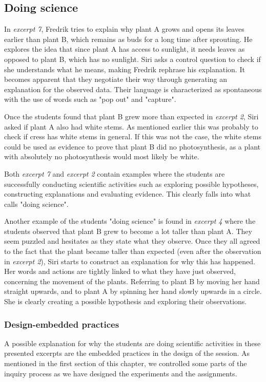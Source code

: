 \subsection{Doing science}
In \emph{excerpt 7}, Fredrik tries to explain why plant A grows and opens its leaves earlier than plant B, which remains as buds for a long time after sprouting. He explores the idea that since plant A has access to sunlight, it needs leaves as opposed to plant B, which has no sunlight. Siri asks a control question to check if she understands what he means, making Fredrik rephrase his explanation. It becomes apparent that they negotiate their way through generating an explanation for the observed data. Their language is characterized as spontaneous \citep{vygotsky2012thought} with the use of words such as "pop out" and "capture". 

Once the students found that plant B grew more than expected in \emph{excerpt 2}, Siri asked if plant A also had white stems. As mentioned earlier this was probably to check if cress has white stems in general. If this was not the case, the white stems could be used as evidence to prove that plant B did no photosynthesis, as a plant with absolutely no photosynthesis would most likely be white. 

Both \emph{excerpt 7} and \emph{excerpt 2} contain examples where the students are successfully conducting scientific activities such as exploring possible hypotheses, constructing explanations and evaluating evidence. This clearly falls into what \citet{jimenez2000doing} calls "doing science".

Another example of the students "doing science" is found in \emph{excerpt 4} where the students observed that plant B grew to become a lot taller than plant A. They seem puzzled and hesitates as they state what they observe. Once they all agreed to the fact that the plant became taller than expected (even after the observation in \emph{excerpt 2}), Siri starts to construct an explanation for why this has happened. Her words and actions are tightly linked to what they have just observed, concerning the movement of the plants. Referring to plant B by moving her hand straight upwards, and to plant A by spinning her hand slowly upwards in a circle. She is clearly creating a possible hypothesis and exploring their observations. 

\subsubsection{Design-embedded practices}
A possible explanation for why the students are doing scientific activities in these presented excerpts are the embedded practices in the design of the session. As mentioned in the first section of this chapter, we controlled some parts of the inquiry process as we have designed the experiments and the assignments. 

